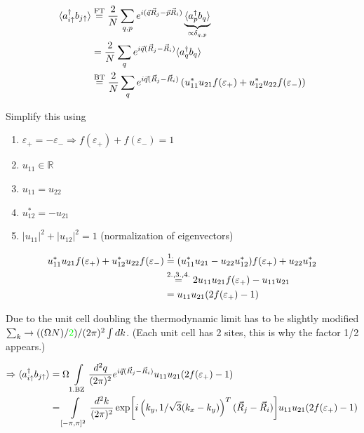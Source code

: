 \documentclass[../../../main.tex]{subfiles}
\begin{document}
\begin{align}
	\langle a_{i\uparrow}^\dagger b_{j\uparrow}\rangle &\overset{\text{FT}}{=} \frac{2}{N}\sum_{q,p} e^{i(\vec{q}\vec{R}_j - \vec{p}\vec{R}_i)} \underbrace{\langle a_p^\dagger b_q \rangle}_{\propto \delta_{q,p}} \notag \\
	&= \frac{2}{N}\sum_q e^{i\vec{q}(\vec{R}_j-\vec{R}_i)}\langle a_q^\dagger b_q \rangle \notag \\
	&\overset{\text{BT}}{=} \frac{2}{N} \sum_q e^{i\vec{q}(\vec{R}_j - \vec{R}_i)}\left(u_{11}^* u_{21} f(\varepsilon_+) + u_{12}^* u_{22} f(\varepsilon_-)\right)
\end{align}

Simplify this using 
\begin{enumerate}
\item $\varepsilon_+ = -\varepsilon_- \Rightarrow f(\varepsilon_+) + f(\varepsilon_-) = 1$
\item $u_{11} \in \mathbb{R}$
\item $u_{11} = u_{22}$
\item $u_{12}^* = -u_{21}$
\item $|u_{11}|^2 + |u_{12}|^2 = 1$ (normalization of eigenvectors)
\end{enumerate}

\begin{align}
	u_{11}^* u_{21} f(\varepsilon_+) + u_{12}^* u_{22} f(\varepsilon_-) &\overset{1.}{=} ( u_{11}^*u_{21} - u_{22} u_{12}^*)f(\varepsilon_+)+ u_{22} u_{12}^* \notag \\
	&\overset{2., 3., 4.}{=} 2u_{11}u_{21}f(\varepsilon_+) - u_{11}u_{21} \notag \\
	&= u_{11}u_{21}(2f(\varepsilon_+) - 1)
\end{align}



Due to the unit cell doubling the thermodynamic limit has to be slightly modified $\sum_k \rightarrow ((\Omega N)/\textcolor{green}{2})/(2\pi)^2\int dk$. (Each unit cell has 2 sites, this is why the factor 1/2 appears.) 

\begin{align}
	\Rightarrow \langle a_{i\uparrow}^\dagger b_{j\uparrow} \rangle &= \Omega \int\limits_{\text{1.BZ}}\frac{d^2q}{(2\pi)^2} e^{i\vec{q}(\vec{R}_j - \vec{R}_i)} u_{11}u_{21} (2f(\varepsilon_+)-1) \notag \\
	&=  \int\limits_{[-\pi,\pi]^2} \frac{d^2k}{(2\pi)^2} \exp[i\left(k_y, 1/\sqrt{3}(k_x-k_y)\right)^T(\vec{R}_j-\vec{R}_i)]u_{11}u_{21} (2f(\varepsilon_+)-1) 
\end{align}
\end{document}
